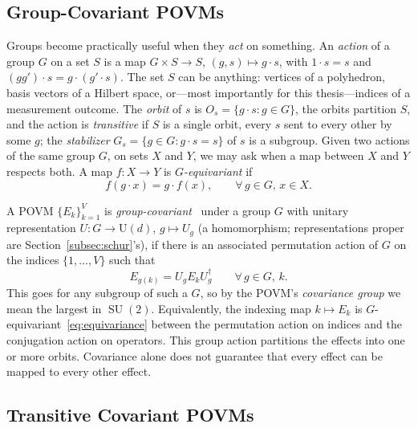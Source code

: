 \documentclass[11pt, oneside, openany]{scrbook}
\DeclareMathOperator{\SU}{SU}
\begin{document}
\subsection{Group-Covariant POVMs} \label{subsec:groupcovariantpovms}

\label{subsec:orbit-stabilizer}Groups become practically useful when they \textit{act} on something. An \textit{action} of a group $G$ on a set $S$ is a map $G \times S \rightarrow S$, $(g, s) \mapsto g \cdot s$, with $1 \cdot s = s$ and $(gg') \cdot s = g \cdot (g' \cdot s)$. The set $S$ can be anything: vertices of a polyhedron, basis vectors of a Hilbert space, or---most importantly for this thesis---indices of a measurement outcome. The \textit{orbit} of $s$ is $O_s = \{ g \cdot s : g \in G \}$, the orbits partition $S$, and the action is \textit{transitive} if $S$ is a single orbit, every $s$ sent to every other by some $g$; the \textit{stabilizer} $G_s = \{ g \in G : g \cdot s = s \}$ of $s$ is a subgroup. Given two actions of the same group $G$, on sets $X$ and $Y$, we may ask when a map between $X$ and $Y$ respects both. A map $f: X \rightarrow Y$ is \textit{$G$-equivariant} if
\begin{equation} \label{eq:equivariance}
  f(g \cdot x) = g \cdot f(x), \qquad \forall\, g \in G,\, x \in X.
\end{equation}

A POVM $\{E_k\}_{k=1}^V$ is \textit{group-covariant}~\cite{holevo2011probabilisticstatisticalaspects, decker2005implementationgroupcovariantpositive,chiribella2004extremalcovariantpositive} under a group $G$ with unitary representation $U: G \rightarrow \mathrm{U}(d)$, $g \mapsto U_g$ (a homomorphism; representations proper are Section~\ref{subsec:schur}'s), if there is an associated permutation action of $G$ on the indices $\{1, \dots, V\}$ such that
\[
  E_{g(k)} = U_g E_k U_g^\dagger \qquad \forall\, g \in G,\, k.
\]
This goes for any subgroup of such a $G$, so by the POVM's \textit{covariance group} we mean the largest in $\SU(2)$. Equivalently, the indexing map $k \mapsto E_k$ is $G$-equivariant~\eqref{eq:equivariance} between the permutation action on indices and the conjugation action on operators. This group action partitions the effects into one or more orbits. Covariance alone does not guarantee that every effect can be mapped to every other effect.

\subsection{Transitive Covariant POVMs}
\end{document}
